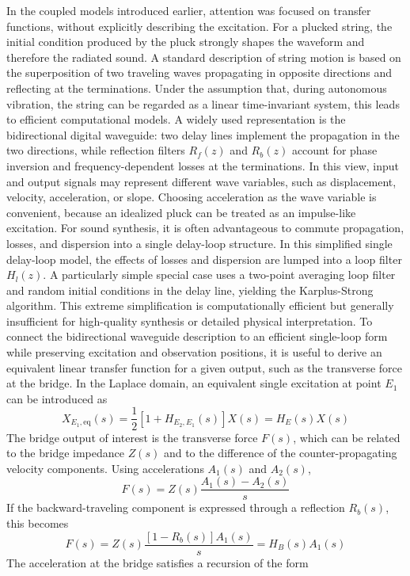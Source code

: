 In the coupled models introduced earlier, attention was focused on transfer functions, without explicitly describing the excitation. For a plucked string, the initial condition produced by the pluck strongly shapes the waveform and therefore the radiated sound. A standard description of string motion is based on the superposition of two traveling waves propagating in opposite directions and reflecting at the terminations. Under the assumption that, during autonomous vibration, the string can be regarded as a linear time-invariant system, this leads to efficient computational models. A widely used representation is the bidirectional digital waveguide: two delay lines implement the propagation in the two directions, while reflection filters \( R_f(z) \) and \( R_b(z) \) account for phase inversion and frequency-dependent losses at the terminations. In this view, input and output signals may represent different wave variables, such as displacement, velocity, acceleration, or slope. Choosing acceleration as the wave variable is convenient, because an idealized pluck can be treated as an impulse-like excitation. For sound synthesis, it is often advantageous to commute propagation, losses, and dispersion into a single delay-loop structure. In this simplified single delay-loop model, the effects of losses and dispersion are lumped into a loop filter \( H_l(z) \). A particularly simple special case uses a two-point averaging loop filter and random initial conditions in the delay line, yielding the Karplus-Strong algorithm. This extreme simplification is computationally efficient but generally insufficient for high-quality synthesis or detailed physical interpretation. To connect the bidirectional waveguide description to an efficient single-loop form while preserving excitation and observation positions, it is useful to derive an equivalent linear transfer function for a given output, such as the transverse force at the bridge. In the Laplace domain, an equivalent single excitation at point \( E_1 \) can be introduced as
\[
X_{E_1,\mathrm{eq}}(s)
=
\frac{1}{2}\left[1+H_{E_2,E_1}(s)\right]X(s)
=
H_E(s)X(s)
\]
The bridge output of interest is the transverse force \( F(s) \), which can be related to the bridge impedance \( Z(s) \) and to the difference of the counter-propagating velocity components. Using accelerations \( A_1(s) \) and \( A_2(s) \),
\[
F(s)=Z(s)\frac{A_1(s)-A_2(s)}{s}
\]
If the backward-traveling component is expressed through a reflection \( R_b(s) \), this becomes
\[
F(s)=Z(s)\frac{\left[1-R_b(s)\right]A_1(s)}{s}=H_B(s)A_1(s)
\]
The acceleration at the bridge satisfies a recursion of the form
